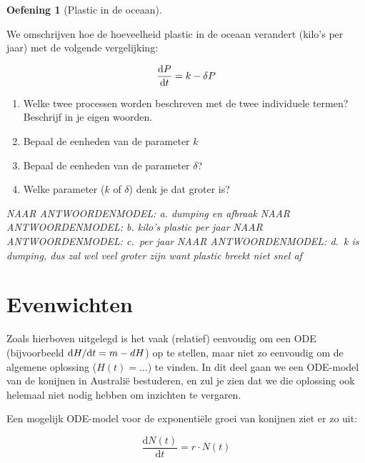 \documentclass[
  a4paper,
]{scrbook}
\providecommand{\tightlist}{%
  \setlength{\itemsep}{0pt}\setlength{\parskip}{0pt}}\usepackage{longtable,booktabs,array}
\theoremstyle{definition}
\newtheorem{exercise}{Oefening}[chapter]
\theoremstyle{remark}
\begin{document}
\begin{exercise}[Plastic in de
oceaan]\protect\hypertarget{exr-eenheden-tussen}{}\label{exr-eenheden-tussen}

We omschrijven hoe de hoeveelheid plastic in de oceaan verandert (kilo's
per jaar) met de volgende vergelijking:

\begin{align}
\mathchoice{\frac{\mathrm{d}P}
{\mathrm{d}t}}{\mathrm{d}P/\mathrm{d}t}
{\mathrm{d}P/\mathrm{d}t}
{\mathrm{d}P/\mathrm{d}t} = k - \delta P
\end{align}

\begin{enumerate}
\def\labelenumi{\alph{enumi}.}
\tightlist
\item
  Welke twee processen worden beschreven met de twee individuele termen?
  Beschrijf in je eigen woorden.
\item
  Bepaal de eenheden van de parameter \(k\)
\item
  Bepaal de eenheden van de parameter \(\delta\)?
\item
  Welke parameter (\(k\) of \(\delta\)) denk je dat groter is?
\end{enumerate}

\emph{NAAR ANTWOORDENMODEL: a. dumping en afbraak} \emph{NAAR
ANTWOORDENMODEL: b. kilo's plastic per jaar} \emph{NAAR ANTWOORDENMODEL:
c.~per jaar} \emph{NAAR ANTWOORDENMODEL: d.~k is dumping, dus zal wel
veel groter zijn want plastic breekt niet snel af}

\end{exercise}

\hypertarget{evenwichten}{%
\section{Evenwichten}\label{evenwichten}}

Zoals hierboven uitgelegd is het vaak (relatief) eenvoudig om een ODE
(bijvoorbeeld \(\mathchoice{\frac{\mathrm{d}H}
{\mathrm{d}t}}{\mathrm{d}H/\mathrm{d}t}
{\mathrm{d}H/\mathrm{d}t}
{\mathrm{d}H/\mathrm{d}t} = m - dH\)) op te stellen, maar niet zo
eenvoudig om de algemene oplossing (\(H(t) = ...\)) te vinden. In dit
deel gaan we een ODE-model van de konijnen in Australië bestuderen, en
zul je zien dat we die oplossing ook helemaal niet nodig hebben om
inzichten te vergaren.

Een mogelijk ODE-model voor de exponentiële groei van konijnen ziet er
zo uit:

\begin{equation}
    \frac{\mathrm{d}N(t)}{\mathrm{d}t} = r \cdot N(t)
\end{equation}
\end{document}
